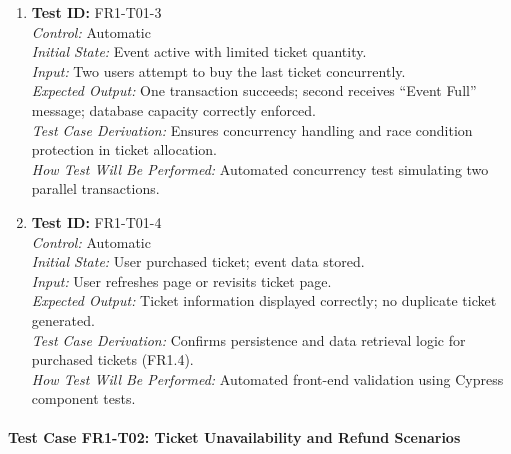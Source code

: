 \documentclass[12pt, titlepage]{article}
\begin{document}
\begin{enumerate}
    \item \textbf{Test ID:} FR1-T01-3\\[0.5em]
    \textit{Control:} Automatic\\[0.3em]
    \textit{Initial State:} Event active with limited ticket quantity.\\[0.3em]
    \textit{Input:} Two users attempt to buy the last ticket concurrently.\\[0.3em]
    \textit{Expected Output:} One transaction succeeds; second receives “Event Full” message; database capacity correctly enforced.\\[0.3em]
    \textit{Test Case Derivation:} Ensures concurrency handling and race condition protection in ticket allocation.\\[0.3em]
    \textit{How Test Will Be Performed:} Automated concurrency test simulating two parallel transactions.

    \item \textbf{Test ID:} FR1-T01-4\\[0.5em]
    \textit{Control:} Automatic\\[0.3em]
    \textit{Initial State:} User purchased ticket; event data stored.\\[0.3em]
    \textit{Input:} User refreshes page or revisits ticket page.\\[0.3em]
    \textit{Expected Output:} Ticket information displayed correctly; no duplicate ticket generated.\\[0.3em]
    \textit{Test Case Derivation:} Confirms persistence and data retrieval logic for purchased tickets (FR1.4).\\[0.3em]
    \textit{How Test Will Be Performed:} Automated front-end validation using Cypress component tests.
\end{enumerate}

\paragraph{Test Case FR1-T02: Ticket Unavailability and Refund Scenarios}
\end{document}
